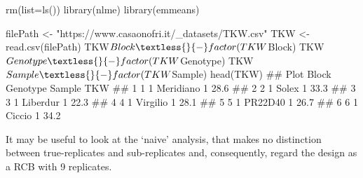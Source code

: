 \documentclass[a4paper,12pt,oneside]{book}
\newenvironment{Shaded}{\begin{snugshade}}{\end{snugshade}}
\newcommand{\SpecialCharTok}[1]{#1}
\newcommand{\StringTok}[1]{#1}
\newcommand{\DocumentationTok}[1]{#1}
\newcommand{\OtherTok}[1]{#1}
\newcommand{\FunctionTok}[1]{#1}
\newcommand{\AttributeTok}[1]{#1}
\newcommand{\NormalTok}[1]{#1}
\begin{document}
\begin{Shaded}
\begin{Highlighting}[]
\FunctionTok{rm}\NormalTok{(}\AttributeTok{list=}\FunctionTok{ls}\NormalTok{())}
\FunctionTok{library}\NormalTok{(nlme)}
\FunctionTok{library}\NormalTok{(emmeans)}

\NormalTok{filePath }\OtherTok{\textless{}{-}} \StringTok{"https://www.casaonofri.it/\_datasets/TKW.csv"}
\NormalTok{TKW }\OtherTok{\textless{}{-}} \FunctionTok{read.csv}\NormalTok{(filePath)}
\NormalTok{TKW}\SpecialCharTok{$}\NormalTok{Block }\OtherTok{\textless{}{-}} \FunctionTok{factor}\NormalTok{(TKW}\SpecialCharTok{$}\NormalTok{Block)}
\NormalTok{TKW}\SpecialCharTok{$}\NormalTok{Genotype }\OtherTok{\textless{}{-}} \FunctionTok{factor}\NormalTok{(TKW}\SpecialCharTok{$}\NormalTok{Genotype)}
\NormalTok{TKW}\SpecialCharTok{$}\NormalTok{Sample }\OtherTok{\textless{}{-}} \FunctionTok{factor}\NormalTok{(TKW}\SpecialCharTok{$}\NormalTok{Sample)}
\FunctionTok{head}\NormalTok{(TKW)}
\DocumentationTok{\#\#   Plot Block  Genotype Sample  TKW}
\DocumentationTok{\#\# 1    1     1 Meridiano      1 28.6}
\DocumentationTok{\#\# 2    2     1     Solex      1 33.3}
\DocumentationTok{\#\# 3    3     1  Liberdur      1 22.3}
\DocumentationTok{\#\# 4    4     1  Virgilio      1 28.1}
\DocumentationTok{\#\# 5    5     1   PR22D40      1 26.7}
\DocumentationTok{\#\# 6    6     1    Ciccio      1 34.2}
\end{Highlighting}
\end{Shaded}

It may be useful to look at the `naive' analysis, that makes no distinction between true-replicates and sub-replicates and, consequently, regard the design as a RCB with 9 replicates.
\end{document}
